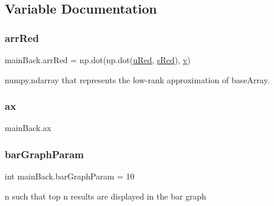 \subsection{Variable Documentation}
\mbox{\label{namespacemain_back_ae39c5f6bff104ca56fdeaac54c183913}} 
\subsubsection{\texorpdfstring{arr\+Red}{arrRed}}
{\footnotesize\ttfamily main\+Back.\+arr\+Red = np.\+dot(np.\+dot(\hyperlink{namespacemain_back_a5219f1f00f1e13deec736f49b9019c11}{u\+Red}, \hyperlink{namespacemain_back_a00584a33a7cf37843fda73a71092ef9d}{s\+Red}), \hyperlink{namespacemain_back_a92b2e5bb31556f8f2634ccb0d66c3fa3}{v})}



numpy.\+ndarray that represents the low-\/rank approximation of base\+Array. 

\mbox{\label{namespacemain_back_a38c2a7421333f3468e902a87b6e93173}} 
\subsubsection{\texorpdfstring{ax}{ax}}
{\footnotesize\ttfamily main\+Back.\+ax}

\mbox{\label{namespacemain_back_a37d9bf68cddbfd68b167647d790ffe9a}} 
\subsubsection{\texorpdfstring{bar\+Graph\+Param}{barGraphParam}}
{\footnotesize\ttfamily int main\+Back.\+bar\+Graph\+Param = 10}



n such that top n results are displayed in the bar graph 

\mbox{\label{namespacemain_back_ab3e90b2d4ac29c0647e746d41ea35ec6}} 
